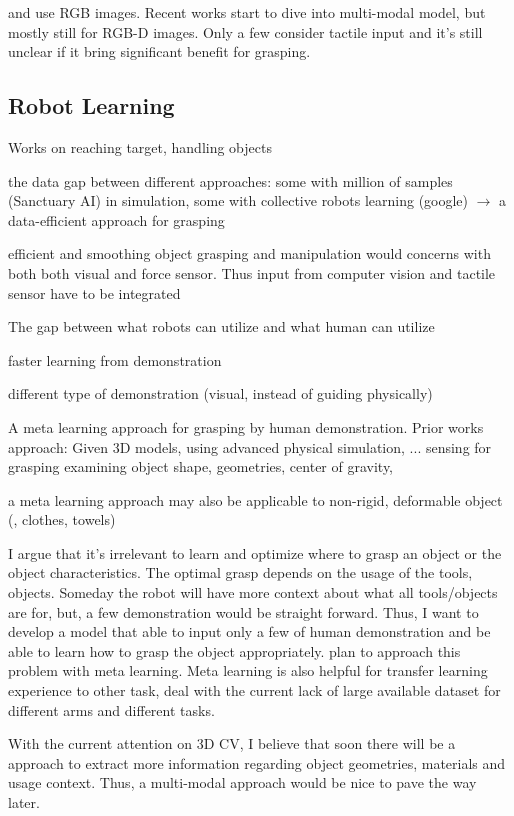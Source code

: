 and use RGB images. Recent works start to dive into multi-modal model, but mostly still for RGB-D images. Only a few consider tactile input and it's still  unclear if it bring significant benefit for grasping.
\cite{calandra2017feeling} 

\subsection{Robot Learning}
Works on reaching target, handling objects

the data gap between different approaches: some with million of samples (Sanctuary AI) in simulation, some with collective robots learning (google) $\rightarrow$ a data-efficient approach for grasping

efficient and smoothing object grasping and manipulation would concerns with both both visual and force sensor. Thus input from computer vision and tactile sensor have to be integrated \cite{haddadin2018tactile}

The gap between what robots can utilize and what human can utilize

faster learning from demonstration

different type of demonstration (visual, instead of guiding physically)

A meta learning approach for grasping by human demonstration. Prior works approach:
Given 3D models, using advanced physical simulation, ...
sensing for grasping
examining object shape, geometries, center of gravity, \etc

a meta learning approach may also be applicable to non-rigid, deformable object (\eg, clothes, towels)

I argue that it's irrelevant to learn and optimize where to grasp an object or the object characteristics. The optimal grasp depends on the usage of the tools, objects. Someday the robot will have more context about what all tools/objects are for, but, a few demonstration would be straight forward. Thus, I want to develop a model that able to input only a few of human demonstration and be able to learn how to grasp the object appropriately.
plan to approach this problem with meta learning. Meta learning is also helpful for transfer learning experience to other task, deal with the current lack of large available dataset for different arms and different tasks.

With the current attention on 3D CV, I believe that soon there will be a approach to extract more information regarding object geometries, materials and usage context. Thus, a multi-modal approach would be nice to pave the way later.

